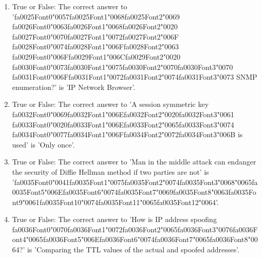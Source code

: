 \documentclass[12pt]{article}
\begin{document}
\begin{enumerate}[label=\arabic*.]
\item True or False: The correct answer to '{\csname fa0025Font0\endcsname\char"0057}{\csname fa0025Font1\endcsname\char"0068}{\csname fa0025Font2\endcsname\char"0069} {\csname fa0026Font0\endcsname\char"0063}{\csname fa0026Font1\endcsname\char"0068}{\csname fa0026Font2\endcsname\char"0020} {\csname fa0027Font0\endcsname\char"0070}{\csname fa0027Font1\endcsname\char"0072}{\csname fa0027Font2\endcsname\char"006F} {\csname fa0028Font0\endcsname\char"0074}{\csname fa0028Font1\endcsname\char"006F}{\csname fa0028Font2\endcsname\char"0063} {\csname fa0029Font0\endcsname\char"006F}{\csname fa0029Font1\endcsname\char"006C}{\csname fa0029Font2\endcsname\char"0020} {\csname fa0030Font0\endcsname\char"0073}{\csname fa0030Font1\endcsname\char"0075}{\csname fa0030Font2\endcsname\char"0070}{\csname fa0030Font3\endcsname\char"0070} {\csname fa0031Font0\endcsname\char"006F}{\csname fa0031Font1\endcsname\char"0072}{\csname fa0031Font2\endcsname\char"0074}{\csname fa0031Font3\endcsname\char"0073} SNMP enumeration?' is 'IP Network Browser'.
\item True or False: The correct answer to 'A session symmetric key {\csname fa0032Font0\endcsname\char"0069}{\csname fa0032Font1\endcsname\char"006E}{\csname fa0032Font2\endcsname\char"0020}{\csname fa0032Font3\endcsname\char"0061} {\csname fa0033Font0\endcsname\char"0020}{\csname fa0033Font1\endcsname\char"006E}{\csname fa0033Font2\endcsname\char"0065}{\csname fa0033Font3\endcsname\char"0074} {\csname fa0034Font0\endcsname\char"0077}{\csname fa0034Font1\endcsname\char"006F}{\csname fa0034Font2\endcsname\char"0072}{\csname fa0034Font3\endcsname\char"006B} is used' is 'Only once'.
\item True or False: The correct answer to 'Man in the middle attack can endanger the security of Diffie Hellman method if two parties are not' is '{\csname fa0035Font0\endcsname\char"0041}{\csname fa0035Font1\endcsname\char"0075}{\csname fa0035Font2\endcsname\char"0074}{\csname fa0035Font3\endcsname\char"0068}{\char"0065}{\csname fa0035Font5\endcsname\char"006E}{\csname fa0035Font6\endcsname\char"0074}{\csname fa0035Font7\endcsname\char"0069}{\csname fa0035Font8\endcsname\char"0063}{\csname fa0035Font9\endcsname\char"0061}{\csname fa0035Font10\endcsname\char"0074}{\csname fa0035Font11\endcsname\char"0065}{\csname fa0035Font12\endcsname\char"0064}'.
\item True or False: The correct answer to 'How is IP address spoofing {\csname fa0036Font0\endcsname\char"0070}{\csname fa0036Font1\endcsname\char"0072}{\csname fa0036Font2\endcsname\char"0065}{\csname fa0036Font3\endcsname\char"0076}{\csname fa0036Font4\endcsname\char"0065}{\csname fa0036Font5\endcsname\char"006E}{\csname fa0036Font6\endcsname\char"0074}{\csname fa0036Font7\endcsname\char"0065}{\csname fa0036Font8\endcsname\char"0064}?' is 'Comparing the TTL values of the actual and spoofed addresses'.

\end{enumerate}
\end{document}
